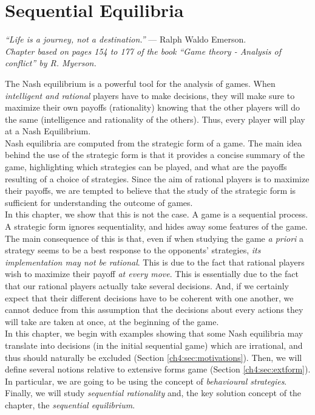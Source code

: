 \ifx \globalmark \undefined %

\else 	
\fi



\chapter{Sequential Equilibria} \label{chap:Seq}

{\large{\itshape
``Life is a journey, not a destination.''} --- Ralph Waldo Emerson.\\
}
  {\small{\itshape
Chapter based on pages 154 to 177 of the book  ``Game theory - Analysis of conflict'' by R. Myerson.}\\
}

The Nash equilibrium is a powerful tool for the analysis of games. When \emph{intelligent and rational} players have to make decisions, they will make sure to maximize their own payoffs (rationality) knowing that the other players will do the same (intelligence and rationality of the others).
Thus, every player will play at a Nash Equilibrium.\\
Nash equilibria are computed from the strategic form of a game. The main idea behind the use of the strategic form is that it provides a concise summary of the game, highlighting which strategies can be played, and what are the payoffs resulting of a choice of strategies.  Since the aim of rational players is to  maximize their payoffs, we are tempted to believe that the study of the strategic form is sufficient for understanding the outcome of games.\\
In this chapter, we show that this is not the case. A game is a sequential process. A strategic form ignores sequentiality, and hides away some features of the game. The main consequence of this is that, even if when studying the game \emph{a priori} a strategy seems to be a best response to the opponents' strategies, \emph{its implementation may not be rational}. This is due to the fact that rational players wish to maximize their payoff \emph{at every move}. This is essentially due to the fact that our rational players actually take several decisions.  And, if we certainly expect that their different decisions have to be coherent with one another, we cannot deduce from this assumption that the decisions about every actions they will take are taken at once, at the beginning of the game.\\
In this chapter, we begin with examples showing that 
some Nash equilibria may translate into decisions (in the initial sequential game) which are irrational, and thus should naturally be excluded (Section \ref{ch4:sec:motivations}). Then, we will define several notions relative to extensive forms game (Section \ref{ch4:sec:extform}). In particular, we are going to be using the concept of \emph{behavioural strategies}. Finally, we will study  \emph{sequential rationality} and,  the key solution concept of the chapter, the \emph{sequential equilibrium}.   





